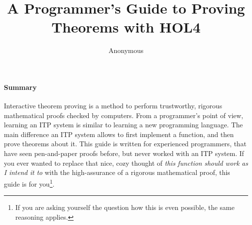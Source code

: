 \documentclass[10pt]{scrartcl}
\title{A Programmer's Guide to Proving Theorems with HOL4}
\author{Anonymous}
\date{}
\begin{document}
\maketitle{}

\paragraph*{Summary}
Interactive theorem proving is a method to perform trustworthy, rigorous
mathematical proofs checked by computers.
From a programmer's point of view, learning an ITP system is similar to
learning a new programming language.
The main difference an ITP system allows to first implement a function,
and then prove theorems about it.
This guide is written for experienced programmers, that have seen pen-and-paper
proofs before, but never worked with an ITP system.
If you ever wanted to replace that nice, cozy thought of \emph{this function
should work as I intend it to} with the high-assurance of a rigorous
mathematical proof, this guide is for you\footnote{If you are asking yourself the question how this is even possible, the same reasoning applies.}.
%

%

%

%

%

%

%
\appendix

%
\printbibliography
%
\end{document}
